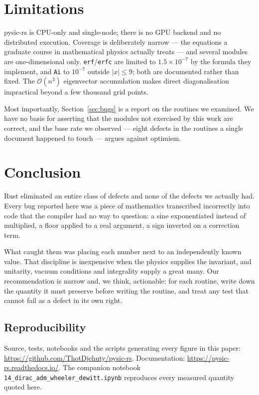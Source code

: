 \documentclass[11pt,a4paper]{article}
\theoremstyle{plain}
\theoremstyle{definition}
\begin{document}
\section{Limitations}

pysic-rs is CPU-only and single-node; there is no GPU backend and no distributed
execution. Coverage is deliberately narrow --- the equations a graduate course
in mathematical physics actually treats --- and several modules are
one-dimensional only. \texttt{erf}/\texttt{erfc} are limited to
$1.5\times10^{-7}$ by the formula they implement, and \texttt{Ai} to $10^{-7}$
outside $|x|\le9$; both are documented rather than fixed. The
$\mathcal O(n^3)$ eigenvector accumulation makes direct diagonalisation
impractical beyond a few thousand grid points.

Most importantly, Section~\ref{sec:bugs} is a report on the routines we
examined. We have no basis for asserting that the modules not exercised by this
work are correct, and the base rate we observed --- eight defects in the
routines a single document happened to touch --- argues against optimism.

\section{Conclusion}

Rust eliminated an entire class of defects and none of the defects we actually
had. Every bug reported here was a piece of mathematics transcribed incorrectly
into code that the compiler had no way to question: a sine exponentiated instead
of multiplied, a floor applied to a real argument, a sign inverted on a
correction term.

What caught them was placing each number next to an independently known value.
That discipline is inexpensive when the physics supplies the invariant, and
unitarity, vacuum conditions and integrality supply a great many. Our
recommendation is narrow and, we think, actionable: for each routine, write down
the quantity it must preserve before writing the routine, and treat any test
that cannot fail as a defect in its own right.

\subsection*{Reproducibility}

Source, tests, notebooks and the scripts generating every figure in this paper:
\url{https://github.com/ThotDjehuty/pysic-rs}. Documentation:
\url{https://pysic-rs.readthedocs.io/}. The companion notebook
\texttt{14\_dirac\_adm\_wheeler\_dewitt.ipynb} reproduces every measured
quantity quoted here.
\end{document}
